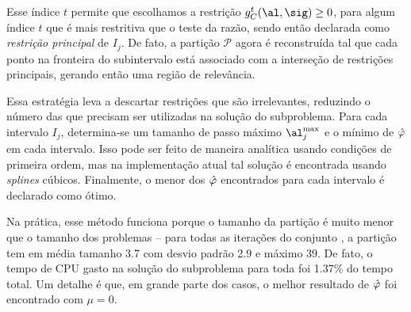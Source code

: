 Esse índice $t$ permite que escolhamos a restrição $g_{C}^{t}(\al,\sig)\geq0$, para algum índice $t$ que é mais restritiva que o teste da razão,   sendo  então declarada como \emph{restrição principal}  de $I_{j}$. De fato, a partição $\mathcal{P}$ agora é reconstruída tal que cada ponto na fronteira do subintervalo está associado com a interseção de restrições principais, gerando então uma região de relevância.

Essa estratégia leva a descartar restrições que são irrelevantes, reduzindo o número das que precisam ser utilizadas  na solução do subproblema.  Para cada intervalo $I_{j}$, determina-se um tamanho de passo máximo $\al^{\max}_{j}$ e o mínimo de $\hat{\varphi}$ em cada intervalo. Isso pode ser feito de maneira analítica usando condições de primeira ordem, mas na implementação atual tal solução é encontrada usando \emph{splines} cúbicos. Finalmente, o menor dos $\hat{\varphi}$ encontrados para cada intervalo é declarado como ótimo.

Na prática, esse método funciona porque o tamanho da partição é muito menor que o tamanho dos problemas -- para todas as iterações do conjunto , a partição tem em média tamanho \num{3.7} com desvio padrão \num{2.9} e máximo \num{39}. De fato, o tempo  de CPU gasto na solução do subproblema  para toda  foi \num{1,37}\% do tempo total. Um detalhe é que, em grande parte dos casos, o melhor resultado de $\hat{\varphi}$ foi encontrado com $\mu=0$.



